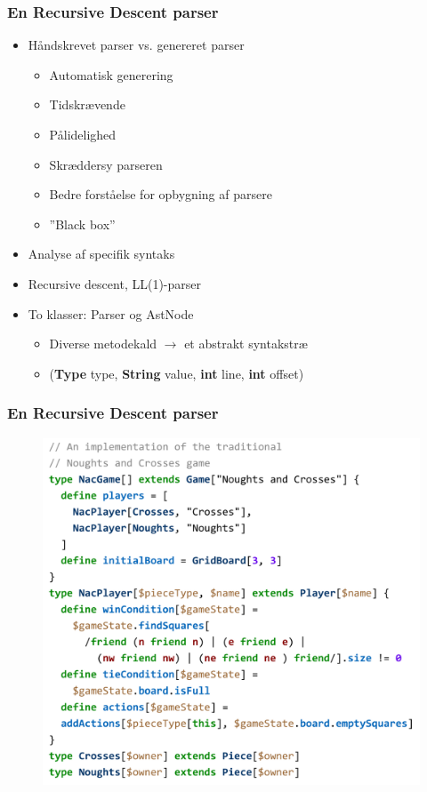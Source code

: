 \begin{frame}
  \frametitle{En Recursive Descent parser}

  \begin{itemize}
    \item Håndskrevet parser vs. genereret parser
      \begin{itemize}
	\item Automatisk generering
	\item Tidskrævende
	\item Pålidelighed
	\item Skræddersy parseren
	\item Bedre forståelse for opbygning af parsere
	\item ''Black box''
      \end{itemize}
    \item Analyse af specifik syntaks
    \item Recursive descent, LL(1)-parser
    \item To klasser: Parser og AstNode
      \begin{itemize}
	\item Diverse metodekald $\rightarrow$ et abstrakt syntakstræ
	\item (\textbf{Type} type, \textbf{String} value, \textbf{int} line,
	  \textbf{int} offset)
      \end{itemize}
  \end{itemize}

\end{frame}

\begin{frame}
  \frametitle{En Recursive Descent parser}

  \begin{figure}
    \includegraphics[width=0.6\linewidth]{billeder/krydsogbolle}
  \end{figure}

\end{frame}
